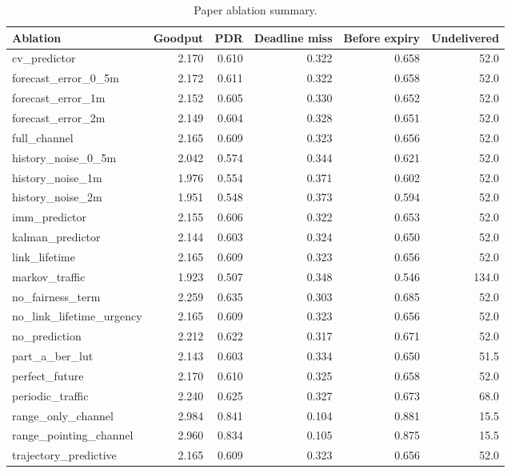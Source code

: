 \begin{table}[t]
\centering
\caption{Paper ablation summary.}
\begin{tabular}{lrrrrr}
\toprule
Ablation & Goodput & PDR & Deadline miss & Before expiry & Undelivered \\
\midrule
cv\_predictor & 2.170 & 0.610 & 0.322 & 0.658 & 52.0 \\
forecast\_error\_0\_5m & 2.172 & 0.611 & 0.322 & 0.658 & 52.0 \\
forecast\_error\_1m & 2.152 & 0.605 & 0.330 & 0.652 & 52.0 \\
forecast\_error\_2m & 2.149 & 0.604 & 0.328 & 0.651 & 52.0 \\
full\_channel & 2.165 & 0.609 & 0.323 & 0.656 & 52.0 \\
history\_noise\_0\_5m & 2.042 & 0.574 & 0.344 & 0.621 & 52.0 \\
history\_noise\_1m & 1.976 & 0.554 & 0.371 & 0.602 & 52.0 \\
history\_noise\_2m & 1.951 & 0.548 & 0.373 & 0.594 & 52.0 \\
imm\_predictor & 2.155 & 0.606 & 0.322 & 0.653 & 52.0 \\
kalman\_predictor & 2.144 & 0.603 & 0.324 & 0.650 & 52.0 \\
link\_lifetime & 2.165 & 0.609 & 0.323 & 0.656 & 52.0 \\
markov\_traffic & 1.923 & 0.507 & 0.348 & 0.546 & 134.0 \\
no\_fairness\_term & 2.259 & 0.635 & 0.303 & 0.685 & 52.0 \\
no\_link\_lifetime\_urgency & 2.165 & 0.609 & 0.323 & 0.656 & 52.0 \\
no\_prediction & 2.212 & 0.622 & 0.317 & 0.671 & 52.0 \\
part\_a\_ber\_lut & 2.143 & 0.603 & 0.334 & 0.650 & 51.5 \\
perfect\_future & 2.170 & 0.610 & 0.325 & 0.658 & 52.0 \\
periodic\_traffic & 2.240 & 0.625 & 0.327 & 0.673 & 68.0 \\
range\_only\_channel & 2.984 & 0.841 & 0.104 & 0.881 & 15.5 \\
range\_pointing\_channel & 2.960 & 0.834 & 0.105 & 0.875 & 15.5 \\
trajectory\_predictive & 2.165 & 0.609 & 0.323 & 0.656 & 52.0 \\
\bottomrule
\end{tabular}
\end{table}
